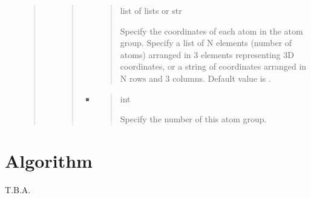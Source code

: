\documentclass[letterpaper,10pt,english]{sphinxmanual}
\begin{document}
\begin{itemize}
\begin{quote}
\begin{itemize}
\begin{quote}
\begin{itemize}
\begin{quote}
 list of lists or str

  Specify the coordinates of each atom in the atom group.
Specify a list of N elements (number of atoms) arranged in 3 elements representing 3D coordinates, or a string of coordinates arranged in N rows and 3 columns.
Default value is  \sphinxtitleref{{[}{[}0.0, 0.0, 0.0{]}{]}}.
\end{quote}

\item {} 
\begin{quote}

 int

Specify the number of this atom group.
\end{quote}

\end{itemize}
\end{quote}

\end{itemize}
\end{quote}

\end{itemize}


\chapter{Algorithm}
\label{\detokenize{algorithm/index::doc}}\label{\detokenize{algorithm/index:algorithm}}
T.B.A.
\end{document}
